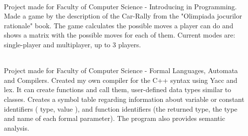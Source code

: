 \documentclass[a4paper]{MagicalCV}
\begin{document}
\begin{minipage}[t]{0.59\textwidth}
 \\
Project made for Faculty of Computer Science - Introducing in Programming. Made a game by the description of the Car-Rally from the "Olimpiada jocurilor rationale" book. The game calculates the possible moves a player can do and shows a matrix with the possible moves for each of them. Current modes are: single-player and multiplayer, up to 3 players.
\sectionsep

 \\
Project made for Faculty of Computer Science - Formal Languages, Automata and Compilers.
Created my own compiler for the C++ syntax using Yacc and lex. It can create functions and call them, user-defined data types similar to classes. Creates a symbol table regarding information about variable or constant identifiers ( type, value ), and function identifiers (the returned type, the type and name of each formal parameter).  The program also provides semantic analysis.
\sectionsep

\end{minipage} 
\end{document}
